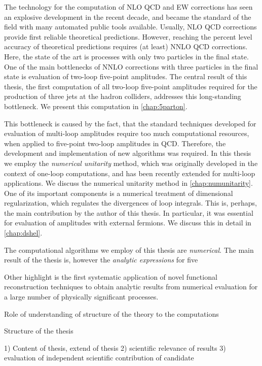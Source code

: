 The technology for the computation of NLO QCD and EW corrections has seen an explosive development
in the recent decade, and became the standard of the field with many automated public tools available.
Usually, NLO QCD corrections provide first reliable theoretical predictions.
However, reaching the percent level accuracy of theoretical predictions requires (at least) NNLO QCD corrections.
Here, the state of the art is processes with only two particles in the final state.
One of the main bottlenecks of NNLO corrections with three particles in the final state is evaluation of two-loop five-point amplitudes.
The central result of this thesis, the first computation of all two-loop five-point amplitudes required for the production
of three jets at the hadron colliders, addresses this long-standing bottleneck. We present this computation in  \cref{chap:5parton}.

This bottleneck is caused by the fact,
that the standard techniques developed for evaluation of multi-loop amplitudes require too much computational resources,
when applied to five-point two-loop amplitudes in QCD.
Therefore, the development and implementation of new algorithms was required.
In this thesis we employ the \emph{numerical unitarity} method, which
was originally developed in the context of one-loop computations,
and has been recently extended for multi-loop applications.
We discuss the numerical unitarity method in \cref{chap:numunitarity}.
One of its important components is a numerical treatment of dimensional regularization, which regulates the divergences of loop integrals.
This is, perhaps, the main contribution by the author of this thesis.
In particular, it was essential for evaluation of amplitudes with external fermions.
We discuss this in detail in \cref{chap:dshel}.

The computational algorithms we employ of this thesis are \emph{numerical}.
The main result of the thesis is, however the \emph{analytic expressions} for five


Other highlight is the first systematic application of novel functional reconstruction techniques to obtain analytic results from numerical evaluation
for a large number of physically significant processes.

Role of understanding of structure of the theory to the computations






Structure of the thesis




1) Content of thesis, extend of thesis
2) scientific relevance of results
3) evaluation of independent scientific contribution of candidate


